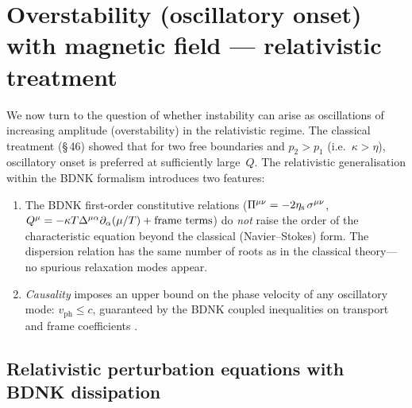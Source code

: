 \section{Overstability (oscillatory onset) with magnetic field ---
         relativistic treatment}
\label{sec:rel-46}

We now turn to the question of whether instability can arise as
oscillations of increasing amplitude (overstability) in the relativistic
regime.  The classical treatment (\S\,46) showed that for two free
boundaries and $p_{2} > p_{1}$ (i.e.\ $\kappa > \eta$), oscillatory
onset is preferred at sufficiently large~$Q$.  The relativistic
generalisation within the BDNK formalism introduces two features:
\begin{enumerate}
  \item The BDNK first-order constitutive relations
    ($\Pi^{\mu\nu}=-2\eta_{\mathrm{s}}\,\sigma^{\mu\nu}$,
    $Q^{\mu}=-\kappa T\Delta^{\mu\alpha}\partial_{\alpha}(\mu/T)
    +\text{frame terms}$)
    do \emph{not} raise the order of the characteristic equation beyond
    the classical (Navier--Stokes) form.  The dispersion relation has the
    same number of roots as in the classical theory---no spurious
    relaxation modes appear.
  \item \emph{Causality} imposes an upper bound on the phase velocity
    of any oscillatory mode: $v_{\mathrm{ph}} \le c$, guaranteed by
    the BDNK coupled inequalities on transport and frame coefficients
    \citep{BemficaDN2018,Kovtun2019}.
\end{enumerate}

\subsection{Relativistic perturbation equations with BDNK
            dissipation}
\label{subsec:rel-46-perturb}

